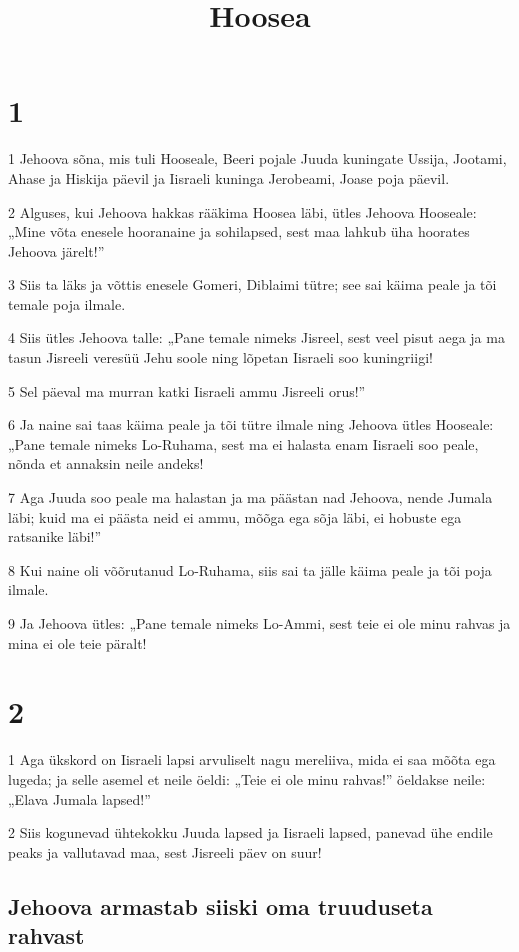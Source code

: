 

\title{Hoosea}

\chapter{1}

\par 1 Jehoova sõna, mis tuli Hooseale, Beeri pojale Juuda kuningate Ussija, Jootami, Ahase ja Hiskija päevil ja Iisraeli kuninga Jerobeami, Joase poja päevil.
\par 2 Alguses, kui Jehoova hakkas rääkima Hoosea läbi, ütles Jehoova Hooseale: „Mine võta enesele hooranaine ja sohilapsed, sest maa lahkub üha hoorates Jehoova järelt!”
\par 3 Siis ta läks ja võttis enesele Gomeri, Diblaimi tütre; see sai käima peale ja tõi temale poja ilmale.
\par 4 Siis ütles Jehoova talle: „Pane temale nimeks Jisreel, sest veel pisut aega ja ma tasun Jisreeli veresüü Jehu soole ning lõpetan Iisraeli soo kuningriigi!
\par 5 Sel päeval ma murran katki Iisraeli ammu Jisreeli orus!”
\par 6 Ja naine sai taas käima peale ja tõi tütre ilmale ning Jehoova ütles Hooseale: „Pane temale nimeks Lo-Ruhama, sest ma ei halasta enam Iisraeli soo peale, nõnda et annaksin neile andeks!
\par 7 Aga Juuda soo peale ma halastan ja ma päästan nad Jehoova, nende Jumala läbi; kuid ma ei päästa neid ei ammu, mõõga ega sõja läbi, ei hobuste ega ratsanike läbi!”
\par 8 Kui naine oli võõrutanud Lo-Ruhama, siis sai ta jälle käima peale ja tõi poja ilmale.
\par 9 Ja Jehoova ütles: „Pane temale nimeks Lo-Ammi, sest teie ei ole minu rahvas ja mina ei ole teie päralt!

\chapter{2}

\par 1 Aga ükskord on Iisraeli lapsi arvuliselt nagu mereliiva, mida ei saa mõõta ega lugeda; ja selle asemel et neile öeldi: „Teie ei ole minu rahvas!” öeldakse neile: „Elava Jumala lapsed!”
\par 2 Siis kogunevad ühtekokku Juuda lapsed ja Iisraeli lapsed, panevad ühe endile peaks ja vallutavad maa, sest Jisreeli päev on suur!
\section*{Jehoova armastab siiski oma truuduseta rahvast}

